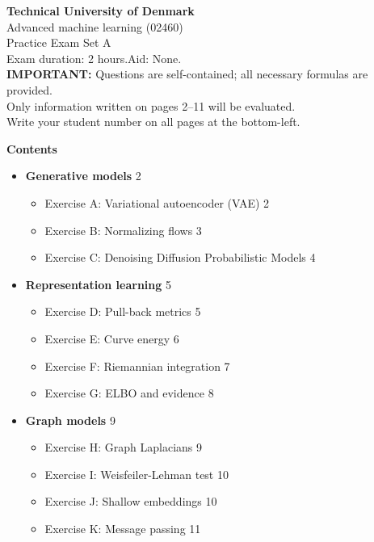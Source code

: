 \documentclass[12pt,a4paper]{article}
\begin{document}
\begin{center}
{\large\bfseries Technical University of Denmark}\\[4pt]
{\large Advanced machine learning (02460)}\\[4pt]
{\large Practice Exam Set A}\\[4pt]
Exam duration: 2 hours.\quad Aid: None.\\[2pt]
\textbf{IMPORTANT:} Questions are self-contained; all necessary formulas are provided.\\
Only information written on pages 2--11 will be evaluated.\\
Write your student number on all pages at the bottom-left.
\end{center}

\bigskip
\textbf{Contents}
\begin{itemize}[noitemsep]
  \item[\textbf{I}] \textbf{Generative models} \hfill 2
  \begin{itemize}[noitemsep]
    \item Exercise A: Variational autoencoder (VAE) \hfill 2
    \item Exercise B: Normalizing flows \hfill 3
    \item Exercise C: Denoising Diffusion Probabilistic Models \hfill 4
  \end{itemize}
  \item[\textbf{II}] \textbf{Representation learning} \hfill 5
  \begin{itemize}[noitemsep]
    \item Exercise D: Pull-back metrics \hfill 5
    \item Exercise E: Curve energy \hfill 6
    \item Exercise F: Riemannian integration \hfill 7
    \item Exercise G: ELBO and evidence \hfill 8
  \end{itemize}
  \item[\textbf{III}] \textbf{Graph models} \hfill 9
  \begin{itemize}[noitemsep]
    \item Exercise H: Graph Laplacians \hfill 9
    \item Exercise I: Weisfeiler-Lehman test \hfill 10
    \item Exercise J: Shallow embeddings \hfill 10
    \item Exercise K: Message passing \hfill 11
  \end{itemize}
\end{itemize}
\end{document}
